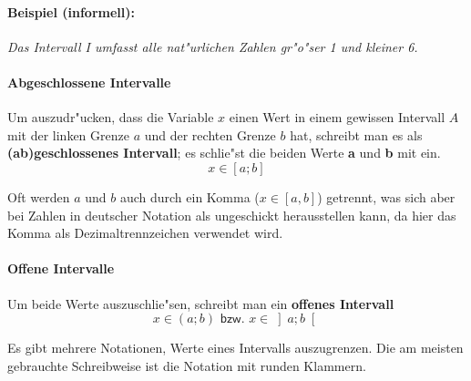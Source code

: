 \paragraph{Beispiel (informell):} \textit{Das Intervall I umfasst alle nat"urlichen Zahlen gr"o"ser 1 und kleiner 6.}

\paragraph{Abgeschlossene Intervalle}
\begin{flushleft}
Um auszudr"ucken, dass die Variable $x$ einen Wert in einem gewissen Intervall $A$ mit der linken Grenze $a$ und der rechten Grenze $b$ hat, schreibt man es als \textbf{(ab)geschlossenes Intervall}; es schlie"st die beiden Werte \textbf{a} und \textbf{b} mit ein. 
\begin{equation*}
x \in \left[a;b \right]
\end{equation*}
\begin{warning}
	Oft werden $a$ und $b$ auch durch ein Komma ($x \in \left[a,b \right]$) getrennt, was sich aber bei Zahlen in deutscher Notation als ungeschickt herausstellen kann, da hier das Komma als Dezimaltrennzeichen verwendet wird.
\end{warning}
\end{flushleft}

\paragraph{Offene Intervalle}
\begin{flushleft}
Um beide Werte auszuschlie"sen, schreibt man ein \textbf{offenes Intervall}
\begin{equation*}
x \in (a;b) \textsf{ bzw. } x \in \left]a;b \right[
\end{equation*}
\end{flushleft}

\begin{warning}
	Es gibt mehrere Notationen, Werte eines Intervalls auszugrenzen. Die am meisten gebrauchte Schreibweise ist die Notation mit runden Klammern.
\end{warning}

